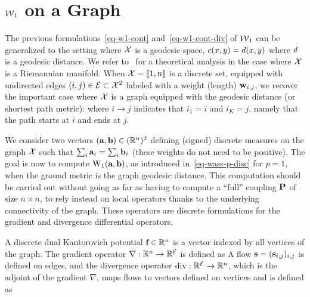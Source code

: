 

\section{$\Wass_1$ on a Graph}

The previous formulations~\eqref{eq-w1-cont} and~\eqref{eq-w1-cont-div} of $\Wass_1$ can be generalized to the setting where $\X$ is a geodesic space, \ie $\c(x,y)=\dist(x,y)$ where $\dist$ is a geodesic distance. We refer to~\citet{FeldmanMacCann02} for a theoretical analysis in the case where $\X$ is a Riemannian manifold.
%
When $\X=\range{1,n}$ is a discrete set, equipped with undirected edges $(i,j) \in \Edges \subset \X^2$ labeled with a weight (length) $\weight_{i,j}$, we recover the important case where $\X$ is a graph equipped with the geodesic distance (or shortest path metric):
where $i \rightarrow j$ indicates that $i_1=i$ and $i_K=j$, namely that the path starts at $i$ and ends at $j$.

We consider two vectors $(\a,\b) \in (\RR^n)^2$ defining (signed) discrete measures on the graph $\X$ such that $\sum_i \a_i = \sum_i \b_i$ (these weights do not need to be positive). 
%
The goal is now to compute $\WassD_1(\a,\b)$, as introduced in~\eqref{eq-wass-p-disc} for $p=1$, when the ground metric is the graph geodesic distance. This computation should be carried out without going as far as having to compute a ``full'' coupling $\P$ of size $n \times n$, to rely instead on local operators thanks to the underlying connectivity of the graph. These operators are discrete formulations for the  gradient and divergence differential operators.

A discrete dual Kantorovich potential $\fD \in \RR^n$ is a vector indexed by all vertices of the graph. The gradient operator $\nabla : \RR^n \rightarrow \RR^{\Edges}$ is defined as
A flow $\flowD = (\flowD_{i,j})_{i,j}$ is defined on edges, and the divergence operator $\diverg : \RR^{\Edges} \rightarrow \RR^n$, which is the adjoint of the gradient $\nabla$, maps flows to vectors defined on vertices and is defined as


